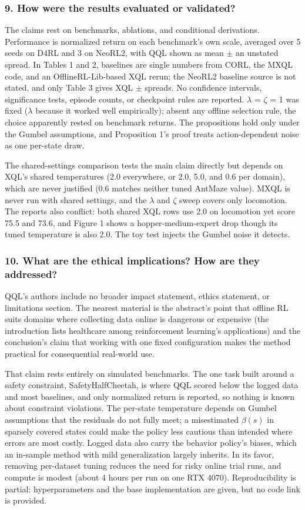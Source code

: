 \documentclass[11pt]{article}
\newcommand{\question}[1]{\subsubsection*{#1}}
\begin{document}
\question{9. How were the results evaluated or validated?}

The claims rest on benchmarks, ablations, and conditional derivations. Performance is normalized return on each benchmark's own scale, averaged over 5 seeds on D4RL and 3 on NeoRL2, with QQL shown as mean \ensuremath{\pm} an unstated spread. In Tables 1 and 2, baselines are single numbers from CORL, the MXQL code, and an OfflineRL-Lib-based XQL rerun; the NeoRL2 baseline source is not stated, and only Table 3 gives XQL \ensuremath{\pm} spreads. No confidence intervals, significance tests, episode counts, or checkpoint rules are reported. \ensuremath{\lambda} = \ensuremath{\zeta} = 1 was fixed (\ensuremath{\lambda} because it worked well empirically); absent any offline selection rule, the choice apparently rested on benchmark returns. The propositions hold only under the Gumbel assumptions, and Proposition 1's proof treats action-dependent noise as one per-state draw.

The shared-settings comparison tests the main claim directly but depends on XQL's shared temperatures (2.0 everywhere, or 2.0, 5.0, and 0.6 per domain), which are never justified (0.6 matches neither tuned AntMaze value). MXQL is never run with shared settings, and the \ensuremath{\lambda} and \ensuremath{\zeta} sweep covers only locomotion. The reports also conflict: both shared XQL rows use 2.0 on locomotion yet score 75.5 and 73.6, and Figure 1 shows a hopper-medium-expert drop though its tuned temperature is also 2.0. The toy test injects the Gumbel noise it detects.

\question{10. What are the ethical implications? How are they addressed?}

QQL's authors include no broader impact statement, ethics statement, or limitations section. The nearest material is the abstract's point that offline RL suits domains where collecting data online is dangerous or expensive (the introduction lists healthcare among reinforcement learning's applications) and the conclusion's claim that working with one fixed configuration makes the method practical for consequential real-world use.

That claim rests entirely on simulated benchmarks. The one task built around a safety constraint, SafetyHalfCheetah, is where QQL scored below the logged data and most baselines, and only normalized return is reported, so nothing is known about constraint violations. The per-state temperature depends on Gumbel assumptions that the residuals do not fully meet; a misestimated $\beta(s)$ in sparsely covered states could make the policy less cautious than intended where errors are most costly. Logged data also carry the behavior policy's biases, which an in-sample method with mild generalization largely inherits. In its favor, removing per-dataset tuning reduces the need for risky online trial runs, and compute is modest (about 4 hours per run on one RTX 4070). Reproducibility is partial: hyperparameters and the base implementation are given, but no code link is provided.
\end{document}
